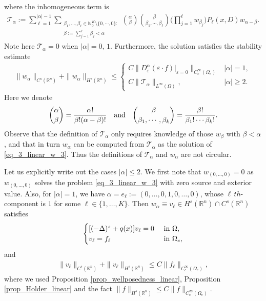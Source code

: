\documentclass [oneside,11pt] {amsart}
\numberwithin{equation}{section}
\newcommand{\R}{\mathbb{R}}
\begin{document}
where the inhomogeneous term is 
\begin{equation}\label{eq_3_def_T}
\begin{aligned}
\mathcal{T}_{\alpha} :=
\sum^{|\alpha|-1}_{\ell=1} \sum_{\substack{ \beta_1,\ldots, \beta_\ell\in \mathbb{N}^K_0\setminus \{0,\cdots,0\} : \\ \beta:= \sum_{j=1}^\ell\beta_j < \alpha }}\binom{\alpha}{\beta} \binom{\beta}{\beta_1,\cdots, \beta_\ell}\bigg( \prod_{j=1}^\ell w_{\beta_j } \bigg)    P_\ell(x,D)w_{\alpha-\beta}.
\end{aligned}    
\end{equation}
Note here $\mathcal{T}_{\alpha} = 0$ when $|\alpha| = 0,\, 1$.
Furthermore, the solution satisfies the stability estimate 
\begin{equation}\label{eq_3_linear_w3_est}
\begin{aligned}
\|w_\alpha\|_{C^{s}(\R^n)}+ \|w_\alpha\|_{H^{s}(\R^n)}
\le 
\begin{cases}
C\|D^\alpha_\varepsilon (\varepsilon\cdot f)|_{\varepsilon=0}\|_{C^\infty_c(\Omega_e)}&|\alpha|=1,\\
C\|\mathcal{T}_\alpha\|_{L^\infty(\Omega)},&|\alpha|\geq 2.
\end{cases}
\end{aligned}
\end{equation}
Here we denote
$$
\binom{\alpha}{\beta} = \frac{\alpha !}{\beta !(\alpha-\beta)!} \quad \hbox{and} \quad 
\binom{\beta}{\beta_1, \cdots, \beta_k}= \frac{\beta!}{\beta_1! \cdots\beta_k!}.
$$
Observe that the definition of $\mathcal T_\alpha$ only requires knowledge of those $w_\beta$ with $\beta<\alpha$, and that in turn $w_\alpha$ can be computed from $\mathcal T_\alpha$ as the solution of \eqref{eq_3_linear_w_3}. Thus the definitions of $\mathcal T_\alpha$ and $w_\alpha$ are not circular.

Let us explicitly write out the cases $|\alpha|\leq 2$. We first note that $w_{(0,\ldots,0)}=0$ as $w_{(0,\ldots,0)}$ solves the problem \eqref{eq_3_linear_w_3} with zero source and exterior value. 
Also, for $|\alpha|=1$, we have $\alpha = e_\ell:=(0,\ldots, 0,1,0,\ldots,0)$, whose $\ell\,th$-component is $1$ for some $\ell\in \{1,\ldots, K\}$. Then 
$w_{\alpha} \equiv v_\ell\in H^s(\R^n)\cap C^{s}(\R^n)$ satisfies
\begin{equation}\label{eq_3_linear_1}
\begin{cases}
[(-\Delta)^s + q(x)]v_\ell = 0 &\hbox{ in } \Omega,\\
v_\ell = f_\ell &\hbox{ in } \Omega_e,
\end{cases}
\end{equation}
and 
\begin{align}\label{eq_3_linear_v_est}
\|v_\ell\|_{C^{s}(\R^n)}+ \|v_\ell\|_{H^{s}(\R^n)}\le C\|f_\ell\|_{C_c^\infty(\Omega_e)},
\end{align}
where we used Proposition \ref{prop_wellposedness_linear}, Proposition \ref{prop_Holder_linear} and the fact $\|f\|_{H^s(\R^n)}\le C\|f\|_{C^\infty_c(\Omega_e)}$.
\end{document}
